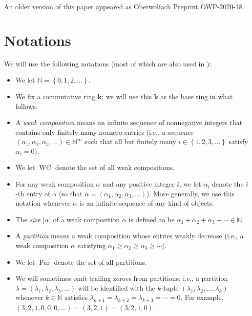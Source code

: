 \documentclass[numbers=enddot,12pt,final,onecolumn,notitlepage]{scrartcl}%
\theoremstyle{definition}
\begin{document}
An older version of this paper appeared as
\href{https://publications.mfo.de/handle/mfo/3773}{Oberwolfach Preprint
OWP-2020-18}.

\section{\label{sect.not}Notations}

We will use the following notations (most of which are also used in
\cite[\S 2.1]{GriRei}):

\begin{itemize}
\item We let $\mathbb{N}=\left\{  0,1,2,\ldots\right\}  $.

\item We fix a commutative ring $\mathbf{k}$; we will use this $\mathbf{k}$ as
the base ring in what follows.

\item A \emph{weak composition} means an infinite sequence of nonnegative
integers that contains only finitely many nonzero entries (i.e., a sequence
$\left(  \alpha_{1},\alpha_{2},\alpha_{3},\ldots\right)  \in\mathbb{N}%
^{\infty}$ such that all but finitely many $i\in\left\{  1,2,3,\ldots\right\}
$ satisfy $\alpha_{i}=0$).

\item We let $\operatorname*{WC}$ denote the set of all weak compositions.

\item For any weak composition $\alpha$ and any positive integer $i$, we let
$\alpha_{i}$ denote the $i$-th entry of $\alpha$ (so that $\alpha=\left(
\alpha_{1},\alpha_{2},\alpha_{3},\ldots\right)  $). More generally, we use
this notation whenever $\alpha$ is an infinite sequence of any kind of objects.

\item The \emph{size} $\left\vert \alpha\right\vert $ of a weak composition
$\alpha$ is defined to be $\alpha_{1}+\alpha_{2}+\alpha_{3}+\cdots
\in\mathbb{N}$.

\item A \emph{partition} means a weak composition whose entries weakly
decrease (i.e., a weak composition $\alpha$ satisfying $\alpha_{1}\geq
\alpha_{2}\geq\alpha_{3}\geq\cdots$).

\item We let $\operatorname*{Par}$ denote the set of all partitions.

\item We will sometimes omit trailing zeroes from partitions: i.e., a
partition $\lambda=\left(  \lambda_{1},\lambda_{2},\lambda_{3},\ldots\right)
$ will be identified with the $k$-tuple $\left(  \lambda_{1},\lambda
_{2},\ldots,\lambda_{k}\right)  $ whenever $k\in\mathbb{N}$ satisfies
$\lambda_{k+1}=\lambda_{k+2}=\lambda_{k+3}=\cdots=0$. For example, $\left(
3,2,1,0,0,0,\ldots\right)  =\left(  3,2,1\right)  =\left(  3,2,1,0\right)  $.


\end{itemize}
\end{document}
